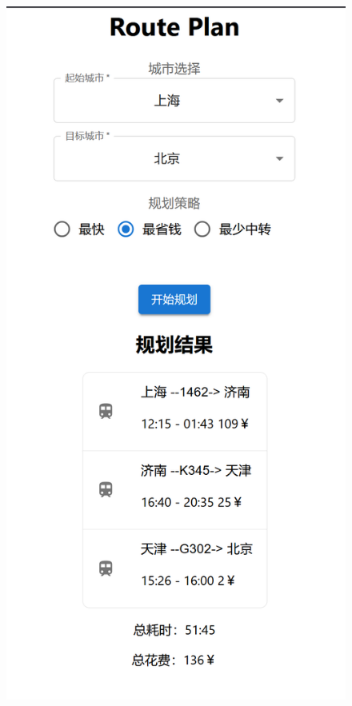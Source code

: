 \documentclass[10pt]{article}
\begin{document}
    \begin{figure}[htbp]
        \centering
        \begin{minipage}[b]{0.45\linewidth}
            \centering
            \includegraphics[width=\linewidth]{img/screenshot002}

\end{minipage}
\end{figure}
\end{document}
